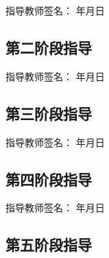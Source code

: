 \documentclass[12pt,a4paper]{ctexart}
\begin{document}
\vspace{4cm}
\noindent 指导教师签名：\underline{\hspace{3cm}} \hspace{2cm} \underline{\hspace{1cm}} 年\underline{\hspace{1cm}}月\underline{\hspace{1cm}}日

\subsection*{第二阶段指导}

\vspace{4cm}
\noindent 指导教师签名：\underline{\hspace{3cm}} \hspace{2cm} \underline{\hspace{1cm}} 年\underline{\hspace{1cm}}月\underline{\hspace{1cm}}日

\subsection*{第三阶段指导}

\vspace{4cm}
\noindent 指导教师签名：\underline{\hspace{3cm}} \hspace{2cm} \underline{\hspace{1cm}} 年\underline{\hspace{1cm}}月\underline{\hspace{1cm}}日

\subsection*{第四阶段指导}

\vspace{4cm}
\noindent 指导教师签名：\underline{\hspace{3cm}} \hspace{2cm} \underline{\hspace{1cm}} 年\underline{\hspace{1cm}}月\underline{\hspace{1cm}}日

\subsection*{第五阶段指导}
\end{document}
